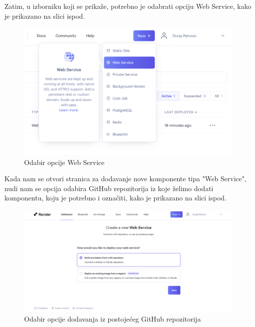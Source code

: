 		Zatim, u izborniku koji se prikaže, potrebno je odabrati opciju Web Service, kako je prikazano na slici ispod.
					\begin{figure}[H]
			\includegraphics[scale=0.4]{slike/Render_WEB_SERVICE.PNG} %
			\centering
			\caption{Odabir opcije Web Service}
			\label{Odabir opcije Web Service}
		\end{figure}
		
		Kada nam se otvori stranica za dodavanje nove komponente tipa "Web Service", nudi nam se opcija odabira GitHub repozitorija iz koje želimo dodati komponentu, koju je potrebno i označiti, kako je prikazano na slici ispod.
		
			\begin{figure}[H]
			\includegraphics[scale=0.4]{slike/Render_ODABIR_OPCIJE.PNG} %
			\centering
			\caption{Odabir opcije dodavanja iz postojećeg GitHub repozitorija}
			\label{Odabir opcije dodavanja iz postojećeg GitHub repozitorija}
		\end{figure}
		

